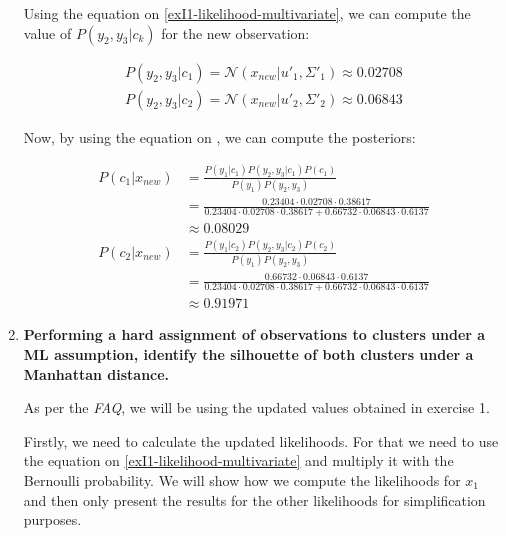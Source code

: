 \documentclass[12pt]{article}
\begin{document}
\begin{enumerate}[leftmargin=\labelsep]
          Using the equation on \eqref{exI1-likelihood-multivariate}, we can compute the value of $P(y_2,y_3|c_k)$ for the new observation:

          \begingroup
          \addtolength{\jot}{0.5em}
          \begin{align*}
              P(y_2,y_3|c_1) = \mathcal{N}(x_{new} | u'_1, \Sigma'_{1}) \approx 0.02708 \\
              P(y_2,y_3|c_2) = \mathcal{N}(x_{new} | u'_2, \Sigma'_{2}) \approx 0.06843
          \end{align*}
          \endgroup

          Now, by using the equation on , we can compute the posteriors:

          \begingroup
          \addtolength{\jot}{0.5em}
          \begin{align*}
            P(c_1 | x_{new}) & = \frac{P(y_1|c_1)P(y_2,y_3|c_1)P(c_1)}{P(y_1)P(y_2,y_3)} \\
                             & = \frac{0.23404 \cdot 0.02708 \cdot 0.38617}{0.23404 \cdot 0.02708 \cdot 0.38617 + 0.66732 \cdot 0.06843 \cdot 0.6137} \\
                             & \approx 0.08029 \\
            P(c_2 | x_{new}) & = \frac{P(y_1|c_2)P(y_2,y_3|c_2)P(c_2)}{P(y_1)P(y_2,y_3)} \\
                             & = \frac{0.66732 \cdot 0.06843 \cdot 0.6137}{0.23404 \cdot 0.02708 \cdot 0.38617 + 0.66732 \cdot 0.06843 \cdot 0.6137} \\
                             & \approx 0.91971
          \end{align*}
          \endgroup

    \item \textbf{Performing a hard assignment of observations to clusters under a ML assumption, identify the silhouette of both clusters under a Manhattan distance.}

          \vskip 0.3cm
          As per the \textit{FAQ}, we will be using the updated values obtained in exercise 1.

          Firstly, we need to calculate the updated likelihoods. For that we need to use the equation on \eqref{exI1-likelihood-multivariate} and multiply it with the Bernoulli probability. 
          We will show how we compute the likelihoods for $x_1$ and then only present the results for the other likelihoods for simplification purposes.


\end{enumerate}
\end{document}
